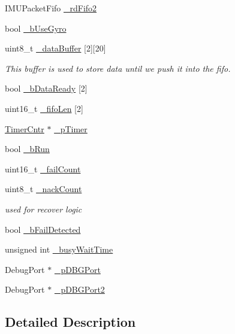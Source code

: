 \begin{DoxyCompactItemize}
IMUPacketFifo \hyperlink{class_i_m_u_a8eb715f35f45943bedc2b9280c3f2cd3}{\_\-rdFifo2}
\item 
bool \hyperlink{class_i_m_u_a0cee90ebd5d0b57fa5ad3890c65108e2}{\_\-bUseGyro}
\item 
uint8\_\-t \hyperlink{class_i_m_u_ab87a54288295d4d10d605cf6c21d4d0f}{\_\-dataBuffer} \mbox{[}2\mbox{]}\mbox{[}20\mbox{]}
\begin{DoxyCompactList}\small\item\em This buffer is used to store data until we push it into the fifo. \item\end{DoxyCompactList}\item 
bool \hyperlink{class_i_m_u_a8a71f0728b2d849d1d8e54fcb58aad4e}{\_\-bDataReady} \mbox{[}2\mbox{]}
\item 
uint16\_\-t \hyperlink{class_i_m_u_a9f7f36da069258a5615886e098527100}{\_\-fifoLen} \mbox{[}2\mbox{]}
\item 
\hyperlink{class_timer_cntr}{TimerCntr} $\ast$ \hyperlink{class_i_m_u_a16e73b1457a346aed16d4b61fae7f2c4}{\_\-pTimer}
\item 
bool \hyperlink{class_i_m_u_a547fe1fb8adb34917aa08663919b97df}{\_\-bRun}
\item 
uint16\_\-t \hyperlink{class_i_m_u_a1e646aa38b84721fc650ef5d3388cc14}{\_\-failCount}
\item 
uint8\_\-t \hyperlink{class_i_m_u_a30c8553ab21b5d6e618c2616f25dafb1}{\_\-nackCount}
\begin{DoxyCompactList}\small\item\em used for recover logic \item\end{DoxyCompactList}\item 
bool \hyperlink{class_i_m_u_a12238a84e20f54c5fe799e0b37feb0ea}{\_\-bFailDetected}
\item 
unsigned int \hyperlink{class_i_m_u_adce31ce2a3317918d73b47e94a2d9227}{\_\-busyWaitTime}
\item 
DebugPort $\ast$ \hyperlink{class_i_m_u_a83a2ffaf84cc04f17ff0301181c45366}{\_\-pDBGPort}
\item 
DebugPort $\ast$ \hyperlink{class_i_m_u_a1cf5672a28049d5885a2958010188928}{\_\-pDBGPort2}
\end{DoxyCompactItemize}


\subsection{Detailed Description}


